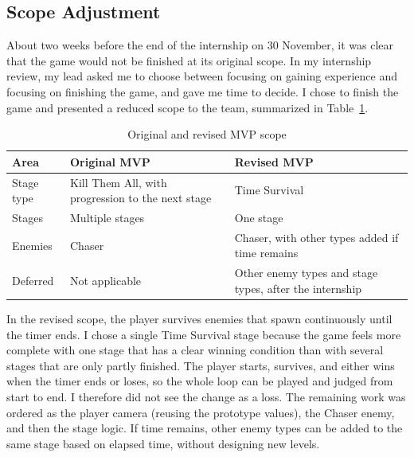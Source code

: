 \subsection{Scope Adjustment}
About two weeks before the end of the internship on 30 November, it was clear that the game would not be finished at its original scope. In my internship review, my lead asked me to choose between focusing on gaining experience and focusing on finishing the game, and gave me time to decide. I chose to finish the game and presented a reduced scope to the team, summarized in Table~\ref{tab:scope}.

\begin{table}[htbp]
    \centering
    \caption{Original and revised MVP scope}
    \label{tab:scope}
    \begin{tabular}{p{3cm}p{5.5cm}p{5.5cm}}
        \toprule
        \textbf{Area} & \textbf{Original MVP} & \textbf{Revised MVP} \\
        \midrule
        Stage type & Kill Them All, with progression to the next stage & Time Survival \\
        Stages & Multiple stages & One stage \\
        Enemies & Chaser & Chaser, with other types added if time remains \\
        Deferred & Not applicable & Other enemy types and stage types, after the internship \\
        \bottomrule
    \end{tabular}
\end{table}

In the revised scope, the player survives enemies that spawn continuously until the timer ends. I chose a single Time Survival stage because the game feels more complete with one stage that has a clear winning condition than with several stages that are only partly finished. The player starts, survives, and either wins when the timer ends or loses, so the whole loop can be played and judged from start to end. I therefore did not see the change as a loss. The remaining work was ordered as the player camera (reusing the prototype values), the Chaser enemy, and then the stage logic. If time remains, other enemy types can be added to the same stage based on elapsed time, without designing new levels.

